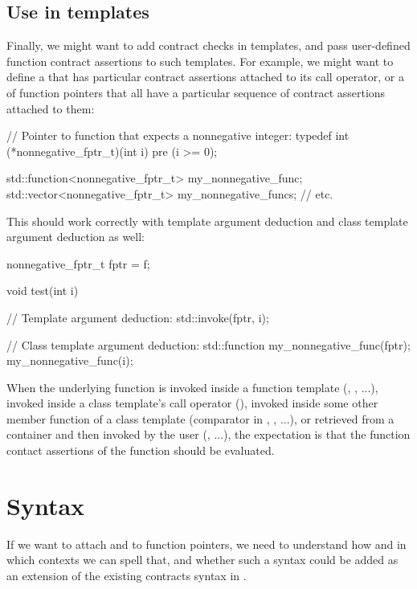 \subsection{Use in templates}
\label{usecase_templates}
Finally, we might want to add contract checks in templates, and pass user-defined function contract assertions to such templates. For example, we might want to define a  that has particular contract assertions attached to its call operator, or a  of function pointers that all have a particular sequence of contract assertions attached to them:
\begin{codeblock}
// Pointer to function that expects a nonnegative integer:
typedef int (*nonnegative_fptr_t)(int i) pre (i >= 0);

std::function<nonnegative_fptr_t> my_nonnegative_func;
std::vector<nonnegative_fptr_t>   my_nonnegative_funcs;
// etc.
\end{codeblock}
This should work correctly with template argument deduction and class template argument deduction as well:
\begin{codeblock}
nonnegative_fptr_t fptr = f;

void test(int i) {
  // Template argument deduction:
  std::invoke(fptr, i);
  
  // Class template argument deduction:
  std::function my_nonnegative_func(fptr);
  my_nonnegative_func(i);
}
\end{codeblock}
When the underlying function is invoked inside a function template (, , ...), invoked inside a class template's call operator (), invoked inside some other member function of a class template (comparator in , , ...), or retrieved from a container and then invoked by the user (, ...), the expectation is that the function contact assertions of the function should be evaluated.



\section{Syntax}
\label{syntax}

If we want to attach  and  to function pointers, we need to understand how and in which contexts we can spell that, and whether such a syntax could be added as an extension of the existing contracts syntax in \cite{P2900R9}.

